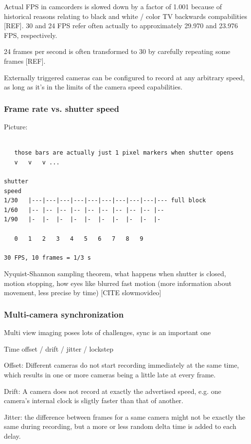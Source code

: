 Actual FPS in camcorders is slowed down by a factor of 1.001 because of historical reasons relating to black and white / color TV backwards compabilities [REF].
30 and 24 FPS refer often actually to approximately 29.970 and 23.976 FPS, respectively.

24 frames per second is often transformed to 30 by carefully repeating some frames [REF].

Externally triggered cameras can be configured to record at any arbitrary speed, as long as it's in the limits of the camera speed capabilities.

\subsubsection{Frame rate vs. shutter speed}

Picture:

\begin{verbatim}

   those bars are actually just 1 pixel markers when shutter opens
   v   v   v ...

shutter
speed
1/30   |---|---|---|---|---|---|---|---|---|--- full block
1/60   |-- |-- |-- |-- |-- |-- |-- |-- |-- |--
1/90   |-  |-  |-  |-  |-  |-  |-  |-  |-  |-

   0   1   2   3   4   5   6   7   8   9

30 FPS, 10 frames = 1/3 s
\end{verbatim}

Nyquist-Shannon sampling theorem, what happens when shutter is closed, motion stopping, how eyes like blurred fast motion (more information about movement, less precise by time) [CITE slowmovideo]

\subsubsection{Multi-camera synchronization}

Multi view imaging poses lots of challenges, sync is an important one

Time offset / drift / jitter / lockstep

Offset: Different cameras do not start recording immediately at the same time, which results in one or more cameras being a little late at every frame.

Drift: A camera does not record at exactly the advertised speed, e.g. one camera's internal clock is sligtly faster than that of another.

Jitter: the difference between frames for a same camera might not be exactly the same during recording, but a more or less random delta time is added to each delay.

